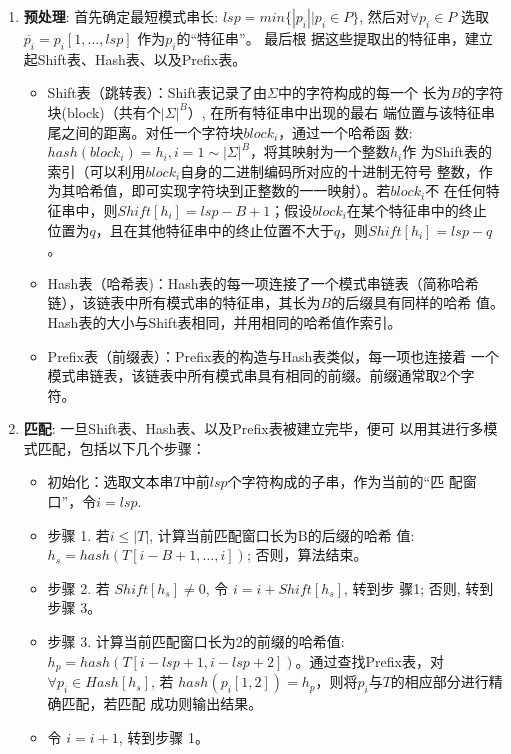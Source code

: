 \begin{enumerate}
\item \textbf{预处理}: 首先确定最短模式串长: $lsp=min\{|p_i||p_i \in
  P\}$, 然后对$\forall p_i \in P$ 选取
  $\overline{p_i} = p_i[1, \dots , lsp]$ 作为$p_i$的“特征串”。 最后根
  据这些提取出的特征串，建立起Shift表、Hash表、以及Prefix表。

  \begin{itemize}
  \item Shift表（跳转表）：Shift表记录了由$\Sigma$中的字符构成的每一个
    长为$B$的字符块(block)（共有个$|\Sigma|^B$）, 在所有特征串中出现的最右
    端位置与该特征串尾之间的距离。对任一个字符块$block_i$，通过一个哈希函
    数:$hash(block_i)=h_i, i=1 \sim |\Sigma|^B$，将其映射为一个整数$h_i$作
    为Shift表的索引（可以利用$block_i$自身的二进制编码所对应的十进制无符号
    整数，作为其哈希值，即可实现字符块到正整数的一一映射）。若$block_i$不
    在任何特征串中，则$Shift[h_i]=lsp-B+1$；假设$block_i$在某个特征串中的终止
    位置为$q$，且在其他特征串中的终止位置不大于$q$，则$Shift[h_i] = lsp-q$。
  \item Hash表（哈希表)：Hash表的每一项连接了一个模式串链表（简称哈希
    链），该链表中所有模式串的特征串，其长为$B$的后缀具有同样的哈希
    值。Hash表的大小与Shift表相同，并用相同的哈希值作索引。
  \item Prefix表（前缀表）：Prefix表的构造与Hash表类似，每一项也连接着
    一个模式串链表，该链表中所有模式串具有相同的前缀。前缀通常取2个字
    符。
  \end{itemize}

\item \textbf{匹配}: 一旦Shift表、Hash表、以及Prefix表被建立完毕，便可
  以用其进行多模式匹配，包括以下几个步骤：

  \begin{itemize}
  \item 初始化：选取文本串$T$中前$lsp$个字符构成的子串，作为当前的“匹
    配窗口”，令$i=lsp$.
  \item 步骤 1. 若$i \leq |T|$, 计算当前匹配窗口长为B的后缀的哈希
    值:$h_s=hash(T[i-B+1, \dots, i])$; 否则，算法结束。
  \item 步骤 2. 若 $Shift[h_s] \neq 0$, 令 $i=i+Shift[h_s]$, 转到步
    骤1; 否则, 转到步骤 3。
  \item 步骤 3. 计算当前匹配窗口长为2的前缀的哈希值:
    $h_p=hash(T[i-lsp+1, i-lsp+2])$。通过查找Prefix表，对
    $\forall p_i \in Hash[h_s]$, 若
    $hash(p_i[1,2])=h_p$，则将$p_i$与$T$的相应部分进行精确匹配，若匹配
    成功则输出结果。
  \item 令 $i=i+1$, 转到步骤 1。
  \end{itemize}
\end{enumerate}

